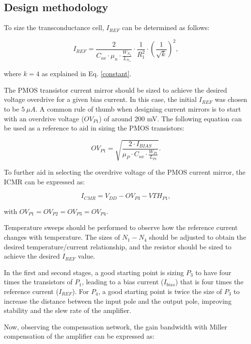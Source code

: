 \documentclass[12pt]{article}
\begin{document}
\subsection{Design methodology}

To size the transconductance cell, $I_{REF}$ can be determined as follows:

\begin{equation} I_{REF} = \frac{2}{C_{ox} \cdot \mu_n \cdot \frac{W_{N_{4}}}{L_{N_{4}}}} \cdot \frac{1}{R_1^2} \cdot \left(\frac{1}{\sqrt{k}}\right)^2, \label{eq
} \end{equation}

where $k=4$ as explained in Eq. \ref{constant}.

The PMOS transistor current mirror should be sized to achieve the desired voltage overdrive for a given bias current. In this case, the initial $I_{REF}$ was chosen to be $5\ \mu A$. A common rule of thumb when designing current mirrors is to start with an overdrive voltage ($OV_{P1}$) of around 200 mV. The following equation can be used as a reference to aid in sizing the PMOS transistors:

\begin{equation} OV_{P1} = \sqrt{\frac{2 \cdot I_{BIAS}}{\mu_{P} \cdot C_{ox} \cdot \frac{W_{P1}}{L_{P1}}}}. \end{equation}

To further aid in selecting the overdrive voltage of the {PMOS} current mirror, the ICMR can be expressed as:

\begin{equation} I_{CMR} = V_{DD} - OV_{P3} - VTH_{P1}, \end{equation}

with $OV_{P1} = OV_{P2} = OV_{P3} = OV_{P4}$.

Temperature sweeps should be performed to observe how the reference current changes with temperature. The sizes of $N_1 - N_4$ should be adjusted to obtain the desired temperature/current relationship, and the resistor should be sized to achieve the desired $I_{REF}$ value.

In the first and second stages, a good starting point is sizing $P_3$ to have four times the transistors of $P_1$, leading to a bias current ($I_{bias}$) that is four times the reference current ($I_{REF}$). For $P_4$, a good starting point is twice the size of $P_3$ to increase the distance between the input pole and the output pole, improving stability and the slew rate of the amplifier.

Now, observing the compensation network, the gain bandwidth with Miller compensation of the amplifier can be expressed as:
\end{document}
